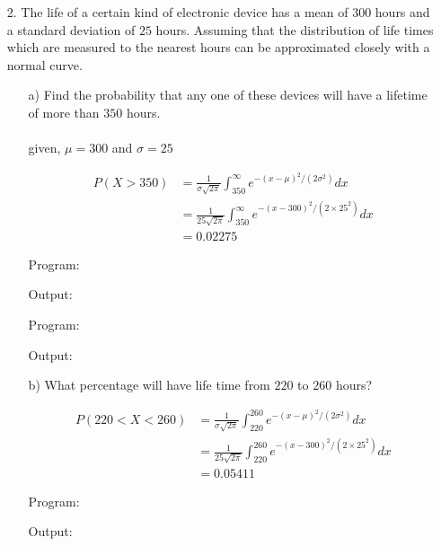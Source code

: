 \documentclass[a4paper,11pt,openright]{report}
\begin{document}
\begin{enumerate}
\pagebreak

\item[2.] The life of a certain kind of electronic device has a mean of $300$ hours and a
standard deviation of $25$ hours. Assuming that the distribution of life times which are
measured to the nearest hours can be approximated closely with a normal curve.

\vspace{1cm}

\begin{enumerate}

\item[a)] Find the probability that any one of these devices will have a lifetime of more
than $350$ hours. \\ \\
given, $\mu = 300$ and $\sigma = 25$

\begin{equation*}
\begin{split}
P(X > 350) &= \frac{1}{\sigma\sqrt{2\pi}} \int_{350}^{\infty} e^{-(x-\mu)^2/(2\sigma^{2})} dx \\
		   &= \frac{1}{25\sqrt{2\pi}} \int_{350}^{\infty} e^{-(x-300)^2/(2 \times 25^{2})} dx \\
		   &= 0.02275
\end{split}
\end{equation*}

Program:

Output:


Program:

Output:


\vspace{1cm}

\item[b)] What percentage will have life time from $220$ to $260$ hours?

\begin{equation*}
\begin{split}
P(220 < X < 260) &= \frac{1}{\sigma\sqrt{2\pi}} \int_{220}^{260} e^{-(x-\mu)^2/(2\sigma^{2})} dx \\
		&= \frac{1}{25\sqrt{2\pi}} \int_{220}^{260} e^{-(x-300)^2/(2 \times 25^{2})} dx \\
		&= 0.05411
\end{split}
\end{equation*}

\pagebreak

Program:

Output:



\end{enumerate}
\end{enumerate}
\end{document}
